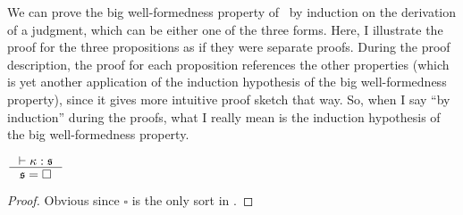 We can prove the big well-formedness property of \Fi\ by induction on
the derivation of a judgment, which can be either one of the three forms.
Here, I illustrate the proof for the three propositions as if they were
separate proofs. During the proof description, the proof for each proposition
references the other properties (which is yet another application of the
induction hypothesis of the big well-formedness property), since it gives
more intuitive proof sketch that way. So, when I say ``by induction''
during the proofs, what I really mean is the induction hypothesis of
the big well-formedness property.

\begin{proposition}
\label{prop:wfsort}
$ \inference{ |- \kappa : \mathfrak{s} }{ \mathfrak{s}=\square } $
\end{proposition}
\begin{proof}Obvious since $\square$ is the only sort in \Fi.\end{proof}

